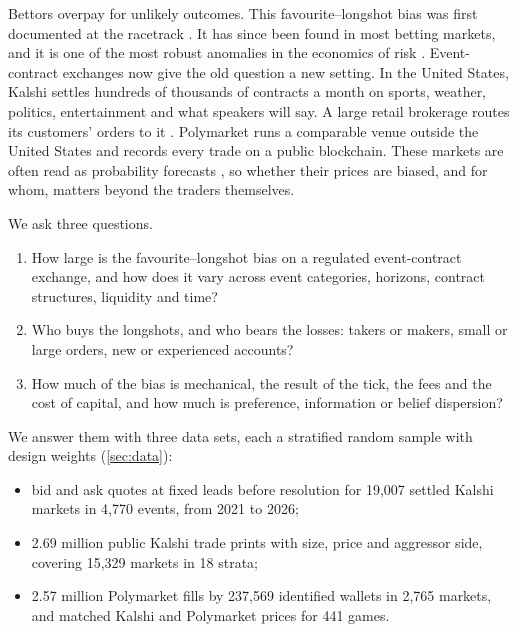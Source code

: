 Bettors overpay for unlikely outcomes. This favourite--longshot bias was first documented at the
racetrack \citep{griffith1949}. It has since been found in most betting markets, and it is one of
the most robust anomalies in the economics of risk \citep{thalerziemba1988,sauer1998,ottaviani2008}.
Event-contract exchanges now give the old question a new setting. In the United States, Kalshi
settles hundreds of thousands of contracts a month on sports, weather, politics, entertainment and
what speakers will say. A large retail brokerage routes its customers' orders to it
\citep{robinhood2025}. Polymarket runs a comparable venue outside the United States and records
every trade on a public blockchain. These markets are often read as probability forecasts
\citep{wolferszitzewitz2004}, so whether their prices are biased, and for whom, matters beyond the
traders themselves.

We ask three questions.
\begin{enumerate}
  \item How large is the favourite--longshot bias on a regulated event-contract exchange, and how
  does it vary across event categories, horizons, contract structures, liquidity and time?
  \item Who buys the longshots, and who bears the losses: takers or makers, small or large
  orders, new or experienced accounts?
  \item How much of the bias is mechanical, the result of the tick, the fees and the cost of
  capital, and how much is preference, information or belief dispersion?
\end{enumerate}

We answer them with three data sets, each a stratified random sample with design weights
(\cref{sec:data}):
\begin{itemize}
  \item bid and ask quotes at fixed leads before resolution for 19,007 settled Kalshi markets in
  4,770 events, from 2021 to 2026;
  \item 2.69 million public Kalshi trade prints with size, price and aggressor side, covering
  15,329 markets in 18 strata;
  \item 2.57 million Polymarket fills by 237,569 identified wallets in 2,765 markets, and matched
  Kalshi and Polymarket prices for 441 games.
\end{itemize}

